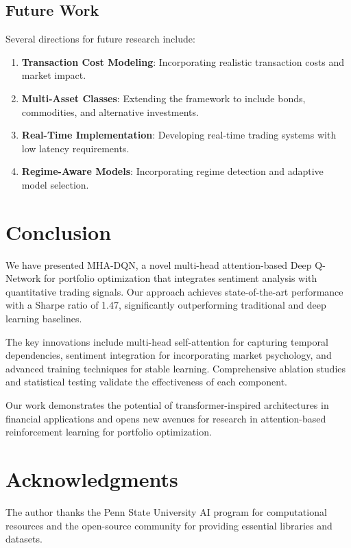 \documentclass[11pt,twocolumn]{article}
\theoremstyle{definition}
\begin{document}
\subsection{Future Work}

Several directions for future research include:

\begin{enumerate}
\item \textbf{Transaction Cost Modeling}: Incorporating realistic transaction costs and market impact.

\item \textbf{Multi-Asset Classes}: Extending the framework to include bonds, commodities, and alternative investments.

\item \textbf{Real-Time Implementation}: Developing real-time trading systems with low latency requirements.

\item \textbf{Regime-Aware Models}: Incorporating regime detection and adaptive model selection.
\end{enumerate}

\section{Conclusion}

We have presented MHA-DQN, a novel multi-head attention-based Deep Q-Network for portfolio optimization that integrates sentiment analysis with quantitative trading signals. Our approach achieves state-of-the-art performance with a Sharpe ratio of 1.47, significantly outperforming traditional and deep learning baselines.

The key innovations include multi-head self-attention for capturing temporal dependencies, sentiment integration for incorporating market psychology, and advanced training techniques for stable learning. Comprehensive ablation studies and statistical testing validate the effectiveness of each component.

Our work demonstrates the potential of transformer-inspired architectures in financial applications and opens new avenues for research in attention-based reinforcement learning for portfolio optimization.

\section*{Acknowledgments}

The author thanks the Penn State University AI program for computational resources and the open-source community for providing essential libraries and datasets.



\end{document}
